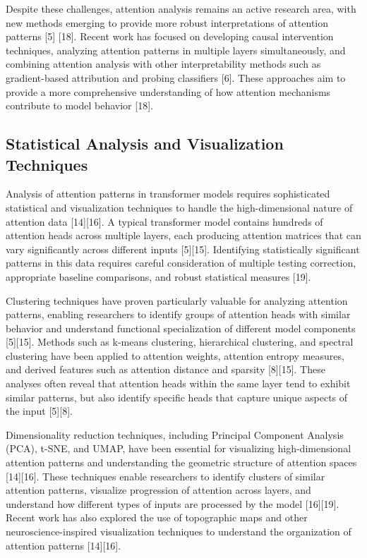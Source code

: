 \documentclass[conference]{IEEEtran}
\begin{document}
Despite these challenges, attention analysis remains an active research area, with new methods emerging to provide more robust interpretations of attention patterns [5] [18]. Recent work has focused on developing causal intervention techniques, analyzing attention patterns in multiple layers simultaneously, and combining attention analysis with other interpretability methods such as gradient-based attribution and probing classifiers [6]. These approaches aim to provide a more comprehensive understanding of how attention mechanisms contribute to model behavior [18].

\subsection{Statistical Analysis and Visualization Techniques}
Analysis of attention patterns in transformer models requires sophisticated statistical and visualization techniques to handle the high-dimensional nature of attention data [14][16]. A typical transformer model contains hundreds of attention heads across multiple layers, each producing attention matrices that can vary significantly across different inputs [5][15]. Identifying statistically significant patterns in this data requires careful consideration of multiple testing correction, appropriate baseline comparisons, and robust statistical measures [19].

Clustering techniques have proven particularly valuable for analyzing attention patterns, enabling researchers to identify groups of attention heads with similar behavior and understand functional specialization of different model components [5][15]. Methods such as k-means clustering, hierarchical clustering, and spectral clustering have been applied to attention weights, attention entropy measures, and derived features such as attention distance and sparsity [8][15]. These analyses often reveal that attention heads within the same layer tend to exhibit similar patterns, but also identify specific heads that capture unique aspects of the input [5][8].

Dimensionality reduction techniques, including Principal Component Analysis (PCA), t-SNE, and UMAP, have been essential for visualizing high-dimensional attention patterns and understanding the geometric structure of attention spaces [14][16]. These techniques enable researchers to identify clusters of similar attention patterns, visualize progression of attention across layers, and understand how different types of inputs are processed by the model [16][19]. Recent work has also explored the use of topographic maps and other neuroscience-inspired visualization techniques to understand the organization of attention patterns [14][16].
\end{document}
